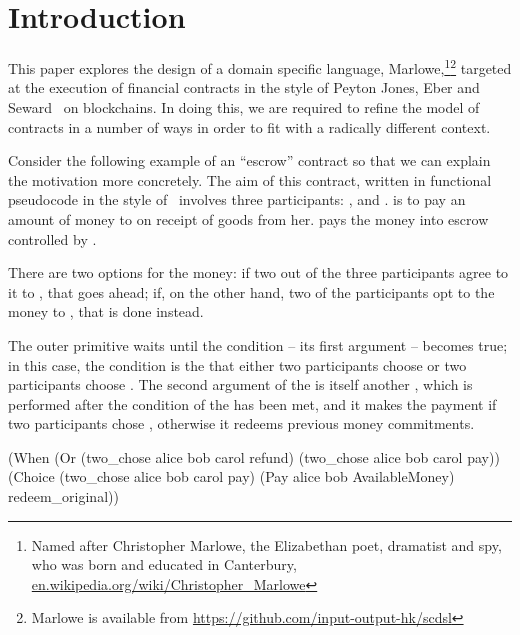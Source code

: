 \documentclass[runningheads]{llncs}
\begin{document}
\section{Introduction}
\label{sec:intro}


This paper explores the design of a domain specific language, Marlowe,\footnote{Named after Christopher 
Marlowe, the Elizabethan poet, dramatist and spy, who was born and educated in Canterbury,  
\url{en.wikipedia.org/wiki/Christopher_Marlowe}}\footnote{Marlowe is available from 
\url{https://github.com/input-output-hk/scdsl}} targeted at the execution of financial contracts in the style of 
Peyton Jones, Eber and Seward~\cite{PeytonJones:2000} on blockchains. In doing this, we are required to refine the 
model of contracts in a number of ways in order to fit with a radically different context. 

Consider the following example of an ``escrow'' contract so that we can explain the motivation 
more concretely. The aim of this contract, written in functional pseudocode in the style of~\cite{PeytonJones:2000} 
involves three participants: ,  and .  
is to pay an amount of money to  on receipt of goods from her.  pays the money 
into escrow controlled by .

There are two options for the money: if two out of the three participants agree to  it to 
, that goes ahead; if, on the other hand, two of the participants opt to  the 
money to , that is done instead.

The outer primitive  waits until the condition -- its first argument -- 
becomes true; in this case, the condition is the that either two participants choose  or two 
participants choose . The second argument of the  is itself another 
, which is performed after the condition of the  has been met, and it makes 
the payment if two participants chose , otherwise it redeems previous money commitments.

\begin{haskellcode}
(When (Or (two_chose alice bob carol refund)
          (two_chose alice bob carol pay))
      (Choice (two_chose alice bob carol pay)
              (Pay alice bob AvailableMoney)
              redeem_original))
\end{haskellcode}
\end{document}
